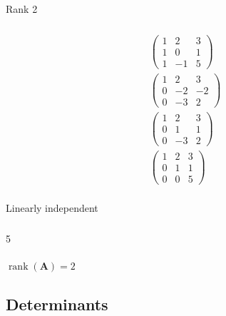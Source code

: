 \documentclass{article}
\newcommand{\rank}{\operatorname{rank}}
\begin{document}
Rank 2

\setcounter{subsubsection}{10}
\subsubsection{}

\begin{align*}
  \begin{pmatrix}
    1 & 2  & 3 \\
    1 & 0  & 1 \\
    1 & -1 & 5
  \end{pmatrix} \\
  \begin{pmatrix}
    1 & 2  & 3  \\
    0 & -2 & -2 \\
    0 & -3 & 2
  \end{pmatrix} \\
  \begin{pmatrix}
    1 & 2  & 3 \\
    0 & 1  & 1 \\
    0 & -3 & 2
  \end{pmatrix} \\
  \begin{pmatrix}
    1 & 2 & 3 \\
    0 & 1 & 1 \\
    0 & 0 & 5
  \end{pmatrix} \\
\end{align*}

Linearly independent

\setcounter{subsubsection}{14}
\subsubsection{}

5

\setcounter{subsubsection}{16}
\subsubsection{}

$\rank(\mathbf{A}) = 2$

\subsection{Determinants}

\subsubsection{}
\end{document}
